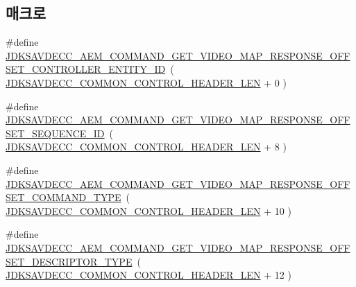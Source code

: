 \subsection*{매크로}
\begin{DoxyCompactItemize}
\item 
\#define \hyperlink{group__command__get__video__map__response_ga29804054dcba12cde0a69e51a3f72cbd}{J\+D\+K\+S\+A\+V\+D\+E\+C\+C\+\_\+\+A\+E\+M\+\_\+\+C\+O\+M\+M\+A\+N\+D\+\_\+\+G\+E\+T\+\_\+\+V\+I\+D\+E\+O\+\_\+\+M\+A\+P\+\_\+\+R\+E\+S\+P\+O\+N\+S\+E\+\_\+\+O\+F\+F\+S\+E\+T\+\_\+\+C\+O\+N\+T\+R\+O\+L\+L\+E\+R\+\_\+\+E\+N\+T\+I\+T\+Y\+\_\+\+ID}~( \hyperlink{group__jdksavdecc__avtp__common__control__header_gaae84052886fb1bb42f3bc5f85b741dff}{J\+D\+K\+S\+A\+V\+D\+E\+C\+C\+\_\+\+C\+O\+M\+M\+O\+N\+\_\+\+C\+O\+N\+T\+R\+O\+L\+\_\+\+H\+E\+A\+D\+E\+R\+\_\+\+L\+EN} + 0 )
\item 
\#define \hyperlink{group__command__get__video__map__response_ga000b8ed84dacac9e21f1b67b08ee8ab5}{J\+D\+K\+S\+A\+V\+D\+E\+C\+C\+\_\+\+A\+E\+M\+\_\+\+C\+O\+M\+M\+A\+N\+D\+\_\+\+G\+E\+T\+\_\+\+V\+I\+D\+E\+O\+\_\+\+M\+A\+P\+\_\+\+R\+E\+S\+P\+O\+N\+S\+E\+\_\+\+O\+F\+F\+S\+E\+T\+\_\+\+S\+E\+Q\+U\+E\+N\+C\+E\+\_\+\+ID}~( \hyperlink{group__jdksavdecc__avtp__common__control__header_gaae84052886fb1bb42f3bc5f85b741dff}{J\+D\+K\+S\+A\+V\+D\+E\+C\+C\+\_\+\+C\+O\+M\+M\+O\+N\+\_\+\+C\+O\+N\+T\+R\+O\+L\+\_\+\+H\+E\+A\+D\+E\+R\+\_\+\+L\+EN} + 8 )
\item 
\#define \hyperlink{group__command__get__video__map__response_ga8006d3e46cc51bde8cb4c9d2db8c0d21}{J\+D\+K\+S\+A\+V\+D\+E\+C\+C\+\_\+\+A\+E\+M\+\_\+\+C\+O\+M\+M\+A\+N\+D\+\_\+\+G\+E\+T\+\_\+\+V\+I\+D\+E\+O\+\_\+\+M\+A\+P\+\_\+\+R\+E\+S\+P\+O\+N\+S\+E\+\_\+\+O\+F\+F\+S\+E\+T\+\_\+\+C\+O\+M\+M\+A\+N\+D\+\_\+\+T\+Y\+PE}~( \hyperlink{group__jdksavdecc__avtp__common__control__header_gaae84052886fb1bb42f3bc5f85b741dff}{J\+D\+K\+S\+A\+V\+D\+E\+C\+C\+\_\+\+C\+O\+M\+M\+O\+N\+\_\+\+C\+O\+N\+T\+R\+O\+L\+\_\+\+H\+E\+A\+D\+E\+R\+\_\+\+L\+EN} + 10 )
\item 
\#define \hyperlink{group__command__get__video__map__response_gaac73035546994d41e91f1ab10cfb7af4}{J\+D\+K\+S\+A\+V\+D\+E\+C\+C\+\_\+\+A\+E\+M\+\_\+\+C\+O\+M\+M\+A\+N\+D\+\_\+\+G\+E\+T\+\_\+\+V\+I\+D\+E\+O\+\_\+\+M\+A\+P\+\_\+\+R\+E\+S\+P\+O\+N\+S\+E\+\_\+\+O\+F\+F\+S\+E\+T\+\_\+\+D\+E\+S\+C\+R\+I\+P\+T\+O\+R\+\_\+\+T\+Y\+PE}~( \hyperlink{group__jdksavdecc__avtp__common__control__header_gaae84052886fb1bb42f3bc5f85b741dff}{J\+D\+K\+S\+A\+V\+D\+E\+C\+C\+\_\+\+C\+O\+M\+M\+O\+N\+\_\+\+C\+O\+N\+T\+R\+O\+L\+\_\+\+H\+E\+A\+D\+E\+R\+\_\+\+L\+EN} + 12 )

\end{DoxyCompactItemize}
